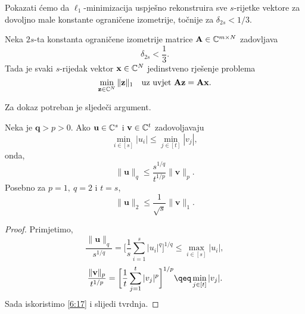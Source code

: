 \documentclass[a4paper,twoside,12pt]{memoir} %
\newcommand{\vect}[1]{\mathbf{#1}}
\renewcommand{\vec}{\vect}
\newcommand{\norm}[1]{\|{#1}\|}
\begin{document}
Pokazati \'cemo da $\ell_1$-minimizacija uspje\v{s}no rekonstruira sve $s$-rijetke vektore za dovoljno male konstante ograni\v{c}ene izometrije, to\v{c}nije za $\delta_{2s} < 1/3$.

\begin{thm}\label{tm:6:9} 
    Neka $2s$-ta konstanta ograni\v{c}ene izometrije matrice $\vec A \in \C^{m \times N}$ zadovljava 
    \begin{equation}\label{6:16}
        \delta_{2s} < \frac{1}{3} .
    \end{equation}
    Tada je svaki $s$-rijedak vektor $\vec x \in \C^N$ jedinstveno rje\v{s}enje problema 
    \begin{equation*}
        \min_{\vec z \in \C^N} \norm{\vec z}_1 \quad \text{uz uvjet } \vec{Az} = \vec{Ax}. 
    \end{equation*}
\end{thm}
Za dokaz potreban je sljede\v{c}i argument.
\begin{lem}\label{lem:6:10}
    Neka je $\vec q > p > 0$. Ako $\vec u \in \C^s$ i $\vec v \in \C^t$ zadovoljavaju 
    \begin{equation}\label{6:17}
        \min_{i \in [s]} |u_i| \leq \min_{j \in [t]} |v_j|, 
    \end{equation}
    onda,
    \begin{equation*}
        \norm{\vec u}_q \leq \frac{s^{1/q}}{t^{1/p}} \norm{\vec v}_p.
    \end{equation*}
    Posebno za $p = 1,\  q = 2$ i $t = s$,
    \begin{equation*}
        \norm{\vec u}_2 \leq \frac{1}{\sqrt{s}} \norm{\vec v}_1.
    \end{equation*}
\end{lem}
\begin{proof}
    Primjetimo,
    \begin{equation*}
        \frac{\norm{\vec u}_q}{s^{1/q}} = \bigg[ \frac{1}{s} \sum_{i=1}^s |u_i|^q  \bigg]^{1/q} \leq \max_{i \in [s]} |u_i|, 
    \end{equation*}
    \begin{equation*}
        \frac{\norm{\vec v}_p}{t^{1/p}} = \bigg[ \frac{1}{t} \sum_{j=1}^t |v_j|^p  \bigg]^{1/p} \qeq \min_{j \in [t]} |v_j|.
    \end{equation*}
    Sada iskoristimo \eqref{6:17} i slijedi tvrdnja.
\end{proof}
\end{document}
